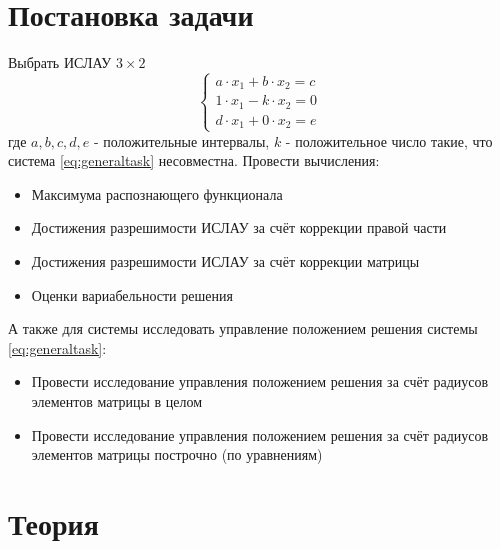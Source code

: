 \documentclass[a4paper,12pt]{article}
\begin{document}
    

    \tableofcontents
    \newpage

    \section{Постановка задачи}
    Выбрать ИСЛАУ $ 3 \times 2 $
    \begin{equation}
        \begin{cases}
            a \cdot x_{1} + b \cdot x_{2} = c \\
            1 \cdot x_{1} - k \cdot x_{2} = 0 \\
            d \cdot x_{1} + 0 \cdot x_{2} = e
        \end{cases}
        \label{eq:generaltask}
    \end{equation}
    где $ a, b, c, d, e $ - положительные интервалы, $ k $ - положительное число такие, что система \ref{eq:generaltask} несовместна. \newline
    Провести вычисления:
    \begin{itemize}
        \item Максимума распознающего функционала
        \item Достижения разрешимости ИСЛАУ за счёт коррекции правой части
        \item Достижения разрешимости ИСЛАУ за счёт коррекции матрицы
        \item Оценки вариабельности решения 
    \end{itemize} 
    А также для системы исследовать управление положением решения системы \ref{eq:generaltask}:
    \begin{itemize}
        \item Провести исследование управления положением решения за счёт радиусов элементов матрицы в целом
        \item Провести исследование управления положением решения за счёт радиусов элементов матрицы построчно (по уравнениям)
    \end{itemize}
    
    \section{Теория}
\end{document}
